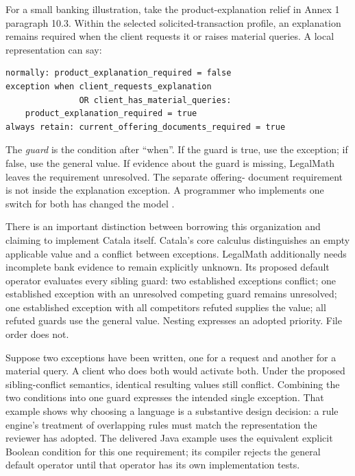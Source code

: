 For a small banking illustration, take the product-explanation relief in Annex
1 paragraph 10.3. Within the selected solicited-transaction profile, an
explanation remains required when the client requests it or raises material
queries. A local representation can say:
\begin{lstlisting}[caption={An exception with an explicit guard. The combined guard avoids creating two competing exceptions for the same requirement.}]
normally: product_explanation_required = false
exception when client_requests_explanation
               OR client_has_material_queries:
    product_explanation_required = true
always retain: current_offering_documents_required = true
\end{lstlisting}
The \emph{guard} is the condition after ``when''. If the guard is true, use the
exception; if false, use the general value. If evidence about the guard is
missing, LegalMath leaves the requirement unresolved. The separate offering-
document requirement is not inside the explanation exception. A programmer
who implements one switch for both has changed the model
\citep[Annex 1, para.~10.3]{sfcspiannex1}.

There is an important distinction between borrowing this organization and
claiming to implement Catala itself. Catala's core calculus distinguishes an
empty applicable value and a conflict between exceptions. LegalMath additionally
needs incomplete bank evidence to remain explicitly unknown. Its proposed
default operator evaluates every sibling guard: two established exceptions
conflict; one established exception with an unresolved competing guard remains
unresolved; one established exception with all competitors refuted supplies the
value; all refuted guards use the general value. Nesting expresses an adopted
priority. File order does not.

Suppose two exceptions have been written, one for a request and another for a
material query. A client who does both would activate both. Under the proposed
sibling-conflict semantics, identical resulting values still conflict. Combining
the two conditions into one guard expresses the intended single exception.
That example shows why choosing a language is a substantive design decision:
a rule engine's treatment of overlapping rules must match the representation
the reviewer has adopted. The delivered Java example uses the equivalent
explicit Boolean condition for this one requirement; its compiler rejects the
general default operator until that operator has its own implementation tests.

